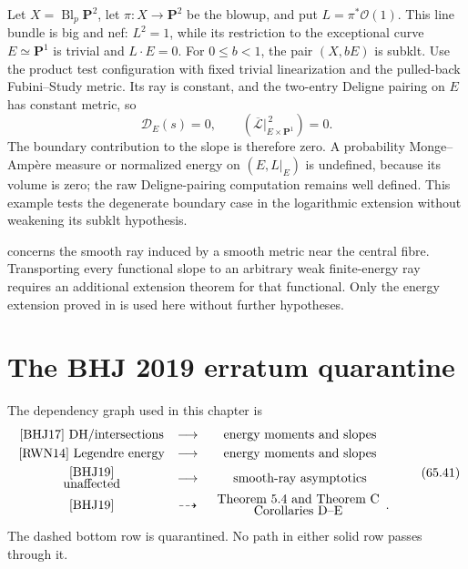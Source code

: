 \noindent\begin{minipage}{\linewidth}
\begin{example}\label{ex:rf-zero-boundary-volume}
Let $X=\operatorname{Bl}_p\mathbf P^2$, let $\pi:X\to\mathbf P^2$ be the
blowup, and put $L=\pi^*\mathcal O(1)$. This line bundle is big and nef:
$L^2=1$, while its restriction to the exceptional curve $E\simeq\mathbf P^1$
is trivial and $L\cdot E=0$. For $0\leq b<1$, the pair $(X,bE)$ is subklt.
Use the product test configuration with fixed trivial linearization and
the pulled-back Fubini--Study metric. Its ray is constant, and the two-entry
Deligne pairing on $E$ has constant metric, so
\[
 \mathcal D_E(s)=0,\qquad
 (\overline{\mathcal L}|_{E\times\mathbf P^1}^{\,2})=0.
\tag{65.40b}\label{eq:rf-zero-boundary-volume}
\]
The boundary contribution to the slope is therefore zero. A probability
Monge--Amp\`ere measure or normalized energy on $(E,L|_E)$ is undefined,
because its volume is zero; the raw Deligne-pairing computation remains
well defined. This example tests the degenerate boundary case in the
logarithmic extension without weakening its subklt hypothesis.
\end{example}
\end{minipage}\par

 concerns the smooth ray induced
by a smooth metric near the central fibre.
Transporting every functional slope to an arbitrary weak finite-energy ray
requires an additional extension theorem for that functional.
Only the energy extension proved in
 is used here without further hypotheses.

\section{The BHJ 2019 erratum quarantine}
\label{sec:rf-erratum-quarantine}

The dependency graph used in this chapter is
\[
\begin{array}{ccc}
\cite{BHJ17}\text{ DH/intersections}
 &\longrightarrow&
\text{energy moments and slopes}
\\[1mm]
\cite{RWN14}\text{ Legendre energy}
 &\longrightarrow&
\text{energy moments and slopes}
\\[1mm]
\begin{array}{c}
\cite[Sections~3--4]{BHJ19}\\[-1mm]
\text{unaffected}
\end{array}
 &\longrightarrow&
\text{smooth-ray asymptotics}
\\[1mm]
\cite[Theorem~5.6]{BHJ19}
 &\dashrightarrow&
\begin{array}{c}
\text{Theorem~5.4 and Theorem~C}\\[-1mm]
\text{Corollaries~D--E}
\end{array}.
\end{array}
\tag{65.41}\label{eq:rf-erratum-dependency-graph}
\]
The dashed bottom row is quarantined.  No path in either solid row passes
through it.

